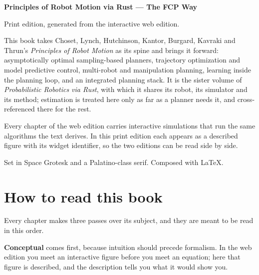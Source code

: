 \documentclass[11pt, twoside, openright]{book}
\begin{document}
\cleardoublepage
\thispagestyle{empty}
\vspace*{\fill}
\noindent
{\fontsize{9}{13}\selectfont\color{shInkSecondary}
\textbf{Principles of Robot Motion via Rust --- The FCP Way}\par
\vspace{5pt}
Print edition, generated from the interactive web edition.\par
\vspace{9pt}
This book takes Choset, Lynch, Hutchinson, Kantor, Burgard, Kavraki and Thrun's
\emph{Principles of Robot Motion} as its spine and brings it forward:
asymptotically optimal sampling-based planners, trajectory optimization and
model predictive control, multi-robot and manipulation planning, learning inside
the planning loop, and an integrated planning stack. It is the sister volume of
\emph{Probabilistic Robotics via Rust}, with which it shares its robot, its
simulator and its method; estimation is treated here only as far as a planner
needs it, and cross-referenced there for the rest.\par
\vspace{9pt}
Every chapter of the web edition carries interactive simulations that run the
same algorithms the text derives. In this print edition each appears as a
described figure with its widget identifier, so the two editions can be read
side by side.\par
\vspace{9pt}
{\color{shInkMuted}Set in Space Grotesk and a Palatino-class serif.
Composed with \LaTeX.}\par}
\vspace*{\fill}

\cleardoublepage
\pagestyle{fancy}
\chapter*{How to read this book}

Every chapter makes three passes over its subject, and they are meant to be read
in this order.

\textbf{Conceptual} comes first, because intuition should precede formalism. In
the web edition you meet an interactive figure before you meet an equation; here
that figure is described, and the description tells you what it would show you.
\end{document}
